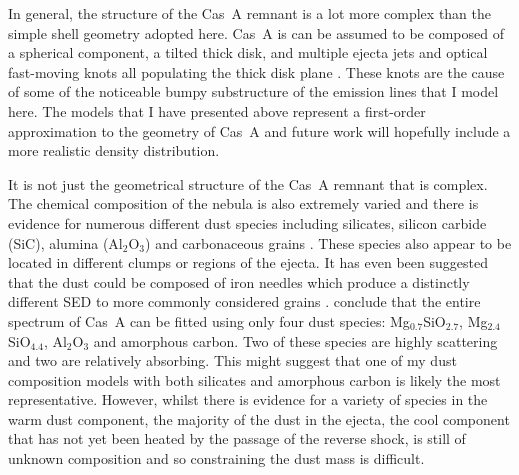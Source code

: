 In general, the structure of the Cas~A remnant is a lot more complex than the simple shell geometry adopted here.  Cas~A is can be assumed to be composed of a spherical component, a tilted thick disk, and multiple ejecta jets and optical fast-moving knots all populating the thick disk plane \citep{DeLaney2010}.  These knots  are the cause of some of the noticeable bumpy substructure of the emission lines that I model here.  The models that I have presented above represent a first-order approximation to the geometry of Cas~A and future work will hopefully include a more realistic density distribution.

It is not just the geometrical structure of the Cas~A remnant that is complex.  The chemical composition of the nebula is also extremely varied and there is evidence for numerous different dust species including silicates, silicon carbide (SiC), alumina (Al$_2$O$_3$) and carbonaceous grains \citep{Arendt2014,Biscaro2014}.  These species also appear to be located in different clumps or regions of the ejecta.  It has even been suggested that the dust could be composed of iron needles which produce a distinctly different SED to more commonly considered grains \citep{Dwek2004}.  \citet{Arendt2014} conclude that the entire spectrum of Cas~A can be fitted using only four dust species: Mg$_0.7$SiO$_2.7$, Mg$_2.4$SiO$_4.4$, Al$_2$O$_3$ and amorphous carbon.  Two of these species are highly scattering and two are relatively absorbing.  This might suggest that one of my dust composition models with both silicates and amorphous carbon is likely the most representative.  However, whilst there is evidence for a variety of species in the warm dust component,  the majority of the dust in the ejecta, the cool component that has not yet been heated by the passage of the reverse shock, is still of unknown composition \citep{Arendt2014} and so constraining the dust mass is difficult.

